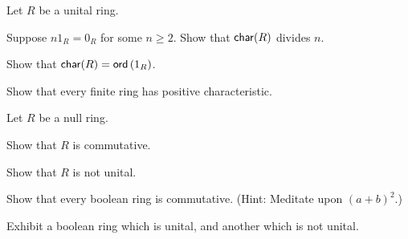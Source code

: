 \begin{exercise}
Let \(R\) be a unital ring.
\begin{proplist*}
\item Suppose \(n1_R = 0_R\) for some \(n \geq 2\).
Show that \(\mathsf{char}(R)\) divides \(n\).
\item Show that \(\mathsf{char}(R) = \mathsf{ord}\left(1_R\right)\).
\end{proplist*}
\end{exercise}


\begin{exercise}
Show that every finite ring has positive characteristic.
\end{exercise}


\begin{exercise}
Let \(R\) be a null ring.
\begin{proplist*}
\item Show that \(R\) is commutative.
\item Show that \(R\) is not unital.
\end{proplist*}
\end{exercise}


\begin{exercise}
Show that every boolean ring is commutative.
(Hint: Meditate upon \((a+b)^2\).)
\end{exercise}


\begin{exercise}
Exhibit a boolean ring which is unital, and another which is not unital.
\end{exercise}
